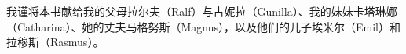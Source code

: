 \thispagestyle{empty}
\begingroup
\parindent 0bp
\parskip 0bp
\vspace*{-13.4bp}%
\hangindent 21.6bp\noindent\hspace*{21.6bp}%
我谨将本书献给我的父母拉尔夫（Ralf）与古妮拉（Gunilla）、我的妹妹卡塔琳娜（Catharina）、她的丈夫马格努斯（Magnus），以及他们的儿子埃米尔（Emil）和拉穆斯（Rasmus）。\par
\endgroup
